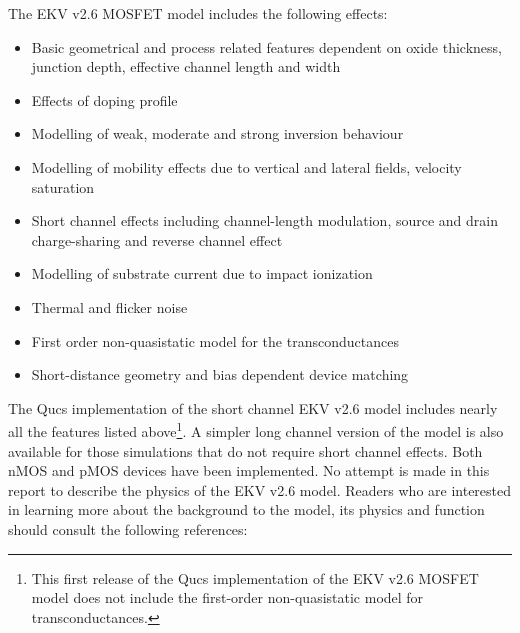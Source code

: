The EKV v2.6 MOSFET model includes the following effects:
\begin{itemize}
 \item Basic geometrical and process related features dependent on oxide thickness, junction depth, effective channel length and width
 \item Effects of doping profile
 \item Modelling of weak, moderate and strong inversion behaviour
 \item Modelling of mobility effects due to vertical and lateral fields, velocity saturation
 \item Short channel effects including channel-length modulation, source and drain charge-sharing and reverse channel effect
 \item Modelling of substrate current due to impact ionization
 \item Thermal and flicker noise
 \item First order non-quasistatic model for the transconductances
 \item Short-distance geometry and bias dependent device matching
\end{itemize}

The Qucs implementation of the short channel EKV v2.6 model includes
nearly all the features listed above\footnote{This first release of
the Qucs implementation of the EKV v2.6 MOSFET model does not include
the first-order non-quasistatic model for transconductances.}. A
simpler long channel version of the model is also available for those
simulations that do not require short channel effects.  Both nMOS and
pMOS devices have been implemented. No attempt is made in this report
to describe the physics of the EKV v2.6 model. Readers who are
interested in learning more about the background to the model, its
physics and function should consult the following references:

